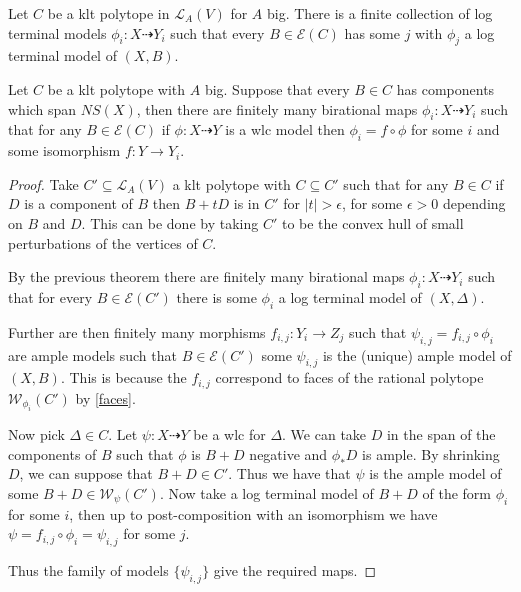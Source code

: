 	\begin{theorem}\cite[Theorem 9.33]{bhatt2020}
		Let $C$ be a klt polytope in $\mathcal{L}_{A}(V)$ for $A$ big. There is a finite collection of log terminal models $\phi_{i}: X \dashrightarrow Y_{i}$ such that  every $B \in \mathcal{E}(C)$ has some $j$ with $\phi_{j}$ a log terminal model of $(X,B)$. 
	\end{theorem}
	
	
	\begin{corollary}\label{klt_finiteness}
		Let $C$ be a klt polytope with $A$ big. Suppose that every $B \in C$ has components which span $NS(X)$, then there are finitely many birational maps $\phi_{i}: X \dashrightarrow Y_{i}$ such that for any $B \in \mathcal{E}(C)$ if $\phi: X \dashrightarrow Y$ is a wlc model then $\phi_{i}=f \circ \phi$ for some $i$ and some isomorphism $f: Y \to Y_{i}$.
	\end{corollary}
	
	\begin{proof}
		
		Take $C'\subseteq \mathcal{L}_{A}(V)$ a klt polytope with $C \subseteq C'$ such that for any $B \in C$ if $D$ is a component of $B$ then $B+tD$ is in $C'$ for $|t| > \epsilon$, for some $\epsilon >0$ depending on $B$ and $D$. This can be done by taking $C'$ to be the convex hull of small perturbations of the vertices of $C$.
		
		By the previous theorem there are finitely many birational maps $\phi_{i}: X \dashrightarrow Y_{i}$ such that for every $B \in \mathcal{E}(C')$ there is some $\phi_{i}$ a log terminal model of $(X,\Delta)$.
		
		Further are then finitely many morphisms $f_{i,j}:Y_{i}\to Z_{j}$ such that $\psi_{i,j}=f_{i,j} \circ \phi_{i}$ are ample models such that $B \in \mathcal{E}(C')$ some $\psi_{i,j}$ is the (unique) ample model of $(X,B)$. This is because the $f_{i,j}$ correspond to faces of the rational polytope $\mathcal{W}_{\phi_{i}}(C')$ by \autoref{faces}.
		
		Now pick $\Delta \in C$. Let $\psi: X \dashrightarrow Y$ be a wlc for $\Delta$. We can take $D$ in the span of the components of $B$ such that $\phi$ is $B+D$ negative and $\phi_{*}D$ is ample. By shrinking $D$, we can suppose that $B+D\in C'$. Thus we have that $\psi$ is the ample model of some $B+D \in \mathcal{W}_{\psi}(C')$. Now take a log terminal model of $B+D$ of the form $\phi_{i}$ for some $i$, then up to post-composition with an isomorphism we have $\psi=f_{i,j} \circ \phi_{i}=\psi_{i,j}$ for some $j$. 
		
		Thus the family of models $\{\psi_{i,j}\}$ give the required maps.
		
	\end{proof}


